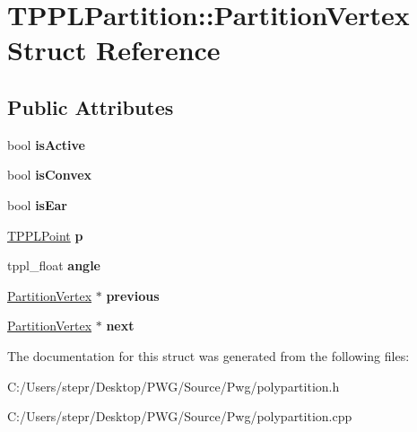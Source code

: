 \hypertarget{struct_t_p_p_l_partition_1_1_partition_vertex}{}\section{T\+P\+P\+L\+Partition\+:\+:Partition\+Vertex Struct Reference}
\label{struct_t_p_p_l_partition_1_1_partition_vertex}
\subsection*{Public Attributes}
\begin{DoxyCompactItemize}
\item 
\mbox{\label{struct_t_p_p_l_partition_1_1_partition_vertex_a081056dc78246d03165f6415fe5596ac}} 
bool {\bfseries is\+Active}
\item 
\mbox{\label{struct_t_p_p_l_partition_1_1_partition_vertex_ae53947cceeca268df813a0b9e7b1a416}} 
bool {\bfseries is\+Convex}
\item 
\mbox{\label{struct_t_p_p_l_partition_1_1_partition_vertex_a357df2820d6055efe2d6ea266ea77193}} 
bool {\bfseries is\+Ear}
\item 
\mbox{\label{struct_t_p_p_l_partition_1_1_partition_vertex_aaba27209ae01a4d74021c2d637661f47}} 
\mbox{\hyperlink{struct_t_p_p_l_point}{T\+P\+P\+L\+Point}} {\bfseries p}
\item 
\mbox{\label{struct_t_p_p_l_partition_1_1_partition_vertex_ab571a3e178d1492ab1666e31530321c4}} 
tppl\+\_\+float {\bfseries angle}
\item 
\mbox{\label{struct_t_p_p_l_partition_1_1_partition_vertex_af94ed5c708526ded7cf68662a70b931d}} 
\mbox{\hyperlink{struct_t_p_p_l_partition_1_1_partition_vertex}{Partition\+Vertex}} $\ast$ {\bfseries previous}
\item 
\mbox{\label{struct_t_p_p_l_partition_1_1_partition_vertex_a4c6eb3ae2b6fa72c3da25ea6d4b53e18}} 
\mbox{\hyperlink{struct_t_p_p_l_partition_1_1_partition_vertex}{Partition\+Vertex}} $\ast$ {\bfseries next}
\end{DoxyCompactItemize}


The documentation for this struct was generated from the following files\+:\begin{DoxyCompactItemize}
\item 
C\+:/\+Users/stepr/\+Desktop/\+P\+W\+G/\+Source/\+Pwg/polypartition.\+h\item 
C\+:/\+Users/stepr/\+Desktop/\+P\+W\+G/\+Source/\+Pwg/polypartition.\+cpp\end{DoxyCompactItemize}
